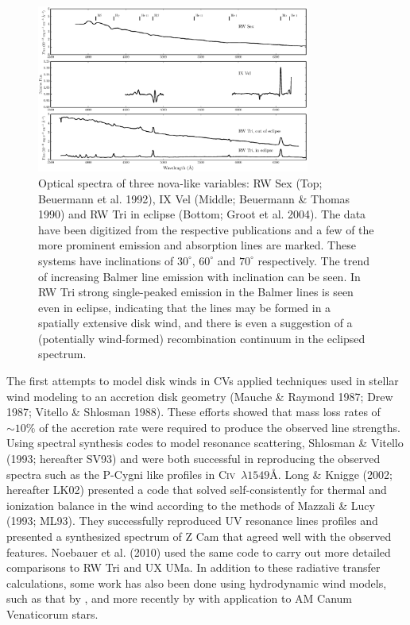 \documentclass[preprint, a4paper, 11pt]{aastex}
\begin{document}
{\begin{figure}	%
\centering
\includegraphics[width=0.8\textwidth]{figures/fig1.eps}
\caption{Optical spectra of three nova-like variables: 
RW Sex (Top; Beuermann et al. 1992),
IX Vel (Middle; Beuermann \& Thomas 1990)
and RW Tri in eclipse (Bottom; Groot et al. 2004).
The data have been digitized from the respective publications and a few of the more
prominent emission and absorption lines are marked. 
These systems have inclinations of $30^\circ$, $60^\circ$ and $70^\circ$ 
respectively.
The trend of increasing Balmer line emission with inclination can be seen.
In RW Tri strong single-peaked emission in the Balmer lines is seen even
in eclipse, indicating that the lines may be formed in a spatially extensive disk wind, and there is even a suggestion
of a (potentially wind-formed) recombination continuum in the eclipsed spectrum.}
\label{novalikes}
\end{figure}

The first attempts to model disk winds in CVs applied techniques used in stellar
wind modeling to an accretion disk geometry (Mauche \& Raymond
1987; Drew 1987; Vitello \& Shlosman 1988). These efforts showed that mass loss rates of
$\sim10\%$ of the accretion rate
were required to produce the observed line strengths.
Using spectral synthesis codes to model resonance scattering,
Shlosman \& Vitello (1993; hereafter SV93)\nocite{SV93} and \cite{KWD95}
were both successful in reproducing the observed spectra such as the P-Cygni like
profiles in C\textsc{iv}~$\lambda1549$\AA.
Long \& Knigge (2002; hereafter LK02)\nocite{LK02} presented a code that
solved self-consistently for thermal and ionization balance in the wind
according to the methods of Mazzali \& Lucy (1993; ML93)\nocite{ML93}. They successfully reproduced
UV resonance lines profiles and presented a synthesized spectrum of Z Cam
that agreed well with the observed features. Noebauer et al. (2010) used the same code 
to carry out more detailed comparisons to RW Tri and UX UMa. In addition to these 
radiative transfer calculations, some work has also been done using hydrodynamic wind models, 
such as that by \cite{pkdh2002}, and more recently by \cite{kusterer2014} with application to
AM Canum Venaticorum stars.

}
\end{document}
